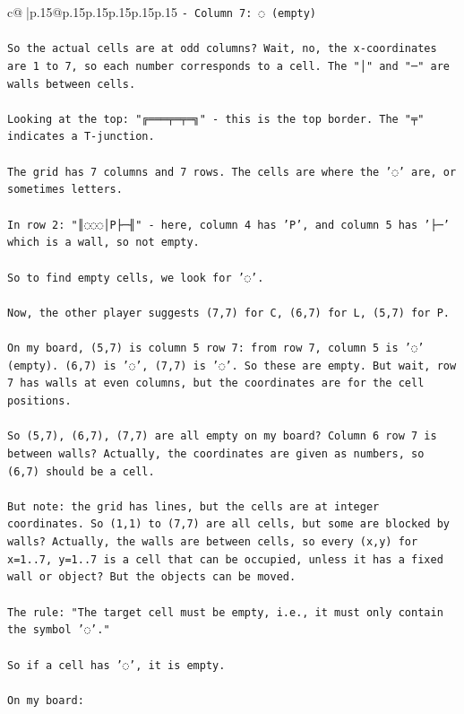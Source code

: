 \documentclass{article}
\begin{document}
{\begin{supertabular}{c@{$\;$}|p{.15\linewidth}@{}p{.15\linewidth}p{.15\linewidth}p{.15\linewidth}p{.15\linewidth}p{.15\linewidth}}
{{{\texttt{{-} Column 7: ◌ (empty)} \\
\\ 
\texttt{So the actual cells are at odd columns? Wait, no, the x{-}coordinates are 1 to 7, so each number corresponds to a cell. The "│" and "─" are walls between cells.} \\
\\ 
\texttt{Looking at the top: "╔═══╤═╤═╗" {-} this is the top border. The "╤" indicates a T{-}junction.} \\
\\ 
\texttt{The grid has 7 columns and 7 rows. The cells are where the '◌' are, or sometimes letters.} \\
\\ 
\texttt{In row 2: "║◌◌◌│P├─╢" {-} here, column 4 has 'P', and column 5 has '├─' which is a wall, so not empty.} \\
\\ 
\texttt{So to find empty cells, we look for '◌'.} \\
\\ 
\texttt{Now, the other player suggests (7,7) for C, (6,7) for L, (5,7) for P.} \\
\\ 
\texttt{On my board, (5,7) is column 5 row 7: from row 7, column 5 is '◌' (empty). (6,7) is '◌', (7,7) is '◌'. So these are empty. But wait, row 7 has walls at even columns, but the coordinates are for the cell positions.} \\
\\ 
\texttt{So (5,7), (6,7), (7,7) are all empty on my board? Column 6 row 7 is between walls? Actually, the coordinates are given as numbers, so (6,7) should be a cell.} \\
\\ 
\texttt{But note: the grid has lines, but the cells are at integer coordinates. So (1,1) to (7,7) are all cells, but some are blocked by walls? Actually, the walls are between cells, so every (x,y) for x=1..7, y=1..7 is a cell that can be occupied, unless it has a fixed wall or object? But the objects can be moved.} \\
\\ 
\texttt{The rule: "The target cell must be empty, i.e., it must only contain the symbol '◌'."} \\
\\ 
\texttt{So if a cell has '◌', it is empty.} \\
\\ 
\texttt{On my board:} \\
}}}
\end{supertabular}}
\end{document}
